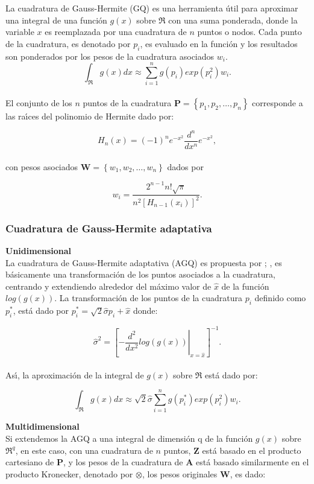 La cuadratura de Gauss-Hermite (GQ) es una herramienta \'{u}til para aproximar una integral de una funci\'{o}n $g(x)$ sobre $\Re$ con una suma ponderada, donde la variable $x$ es reemplazada por una cuadratura de $n$ puntos o nodos. Cada punto de la cuadratura, es denotado por $p_i$, es evaluado en la funci\'{o}n y los resultados son ponderados por los pesos de la cuadratura asociados $w_i$.
\[
\int_\Re{g(x)dx}\approx\sum_{i=1}^{n}{g(p_i)exp(p_i^2)w_i.}
\]
\\
El conjunto de los $n$ puntos de la cuadratura $\textbf{P}=\left\{p_1,p_2,\ldots,p_n\right\}$ corresponde a las ra\'{\i}ces del polinomio de Hermite dado por:

\[
H_n{(x)}=(-1)^ne^{-x^2}\frac{d^n}{dx^n}e^{-x^2},
\]
\\
con pesos asociados $\textbf{W}=\left\{w_1,w_2,\ldots,w_n\right\}$ dados por

\[
w_i=\frac{2^{n-1}n!\sqrt{\pi}}{n^2{[H_{n-1}(x_i)]}^2}.
\]

\subsubsection{Cuadratura de Gauss-Hermite adaptativa}

\textbf{Unidimensional\\}
La cuadratura de Gauss-Hermite adaptativa (AGQ) es propuesta por \cite{Liu1}; \citep{Pinheiro1}, es b\'{a}sicamente una transformaci\'{o}n de los puntos asociados a la cuadratura, centrando y extendiendo alrededor del m\'{a}ximo valor de $\hat{x}$ de la funci\'{o}n $log(g(x))$. La transformaci\'{o}n de los puntos de la cuadratura $p_i$ definido como $p_i^*$, est\'{a} dado por $p_i^*=\sqrt{2}\hat{\sigma}p_i+\hat{x}$ donde:

\[
\hat{\sigma}^2={\left[\left. -\frac{d^2}{dx^2}log(g(x))\right|_{x=\hat{x}}\right]^{-1}}.
\]
\\
As\'{\i}, la aproximaci\'{o}n de la integral de $g(x)$ sobre $\Re$ est\'{a} dado por:

\[
\int_\Re{g(x)dx}\approx\sqrt{2}\hat{\sigma}\sum_{i=1}^{n}{g(p_i^*)exp(p_i^2)w_i.}
\]

\textbf{Multidimensional\\}
Si extendemos la AGQ a una integral de dimensi\'{o}n q de la funci\'{o}n $g(x)$ sobre $\Re^q$, en este caso, con una cuadratura de $n$ puntos, $\textbf{Z}$ est\'{a} basado en el producto cartesiano de $\textbf{P}$, y los pesos de la cuadratura de $\textbf{A}$ est\'{a} basado similarmente en el producto Kronecker, denotado por $\otimes$, los pesos originales $\textbf{W}$, es dado:

